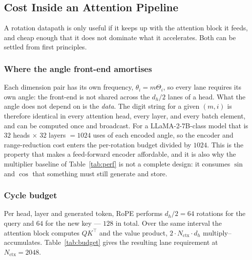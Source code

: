 %

\subsection{Cost Inside an Attention Pipeline}
\label{sec:integration}

A rotation datapath is only useful if it keeps up with the attention block it
feeds, and cheap enough that it does not dominate what it accelerates. Both
can be settled from first principles.

\subsubsection{Where the angle front-end amortises}
Each dimension pair has its own frequency, $\theta_i = m\Theta_i$, so every
lane requires its own angle: the front-end is not shared across the $d_h/2$
lanes of a head. What the angle does not depend on is the \emph{data}. The
digit string for a given $(m, i)$ is therefore identical in every attention
head, every layer, and every batch element, and can be computed once and
broadcast. For a LLaMA-2-7B-class model that is $32$ heads $\times$ $32$
layers $= 1024$ uses of each encoded angle, so the encoder and range-reduction
cost enters the per-rotation budget divided by $1024$. This is the property
that makes a feed-forward encoder affordable, and it is also why the
multiplier baseline of Table~\ref{tab:perf} is not a complete design: it
consumes $\sin$ and $\cos$ that something must still generate and store.

\subsubsection{Cycle budget}
Per head, layer and generated token, RoPE performs $d_h/2 = 64$ rotations for
the query and $64$ for the new key --- $128$ in total. Over the same interval
the attention block computes $QK^\top$ and the value product, $2 \cdot
N_{\text{ctx}} \cdot d_h$ multiply--accumulates. Table~\ref{tab:budget} gives
the resulting lane requirement at $N_{\text{ctx}} = 2048$.

